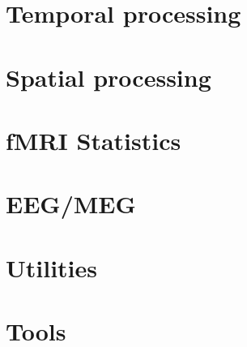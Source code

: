 \documentclass[a4paper,titlepage]{book}
\begin{document}
%


\part{Temporal processing}




\part{Spatial processing}









\part{fMRI Statistics}



%


\part{EEG/MEG}










\part{Utilities}




%



%
%
%

%


\part{Tools}




%
%
\end{document}
